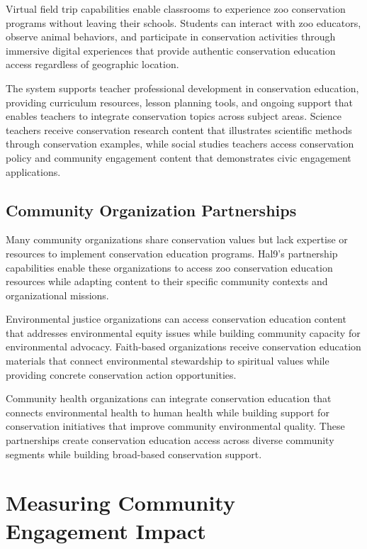 \documentclass[
  Letterpaper,
]{scrbook}
\begin{document}
Virtual field trip capabilities enable classrooms to experience zoo
conservation programs without leaving their schools. Students can
interact with zoo educators, observe animal behaviors, and participate
in conservation activities through immersive digital experiences that
provide authentic conservation education access regardless of geographic
location.

The system supports teacher professional development in conservation
education, providing curriculum resources, lesson planning tools, and
ongoing support that enables teachers to integrate conservation topics
across subject areas. Science teachers receive conservation research
content that illustrates scientific methods through conservation
examples, while social studies teachers access conservation policy and
community engagement content that demonstrates civic engagement
applications.

\subsection{Community Organization
Partnerships}\label{community-organization-partnerships}

Many community organizations share conservation values but lack
expertise or resources to implement conservation education programs.
Hal9's partnership capabilities enable these organizations to access zoo
conservation education resources while adapting content to their
specific community contexts and organizational missions.

Environmental justice organizations can access conservation education
content that addresses environmental equity issues while building
community capacity for environmental advocacy. Faith-based organizations
receive conservation education materials that connect environmental
stewardship to spiritual values while providing concrete conservation
action opportunities.

Community health organizations can integrate conservation education that
connects environmental health to human health while building support for
conservation initiatives that improve community environmental quality.
These partnerships create conservation education access across diverse
community segments while building broad-based conservation support.

\section{Measuring Community Engagement
Impact}\label{measuring-community-engagement-impact}
\end{document}
